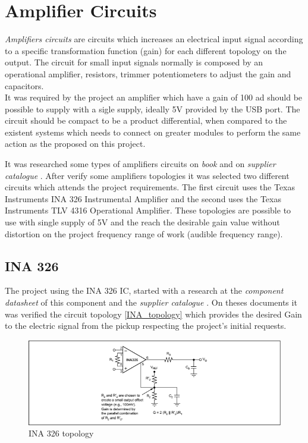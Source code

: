 \chapter{Amplifier Circuits}
\textit{Amplifiers circuits} \cite{amplifier-circuit} are circuits which increases an electrical input signal according
to a specific transformation function (gain) for each different topology on the output. The circuit for small input signals
normally is composed by an operational amplifier, resistors, trimmer potentiometers to adjust the gain and capacitors.\\

It was required by the project an amplifier which have a gain of 100 ad should be possible to supply with a sigle supply, ideally 5V provided by
the USB port. The circuit should be compact to be a product differential, when compared to the existent systems which needs to connect on greater modules
to perform the same action as the proposed on this project.

It was researched some types of amplifiers circuits on \textit{book} \cite{Milmann} and on \textit{supplier catalogue} \cite{OpAmps}.
After verify some amplifiers topologies it was selected two different circuits which attends the project requirements.
The first circuit uses the Texas Instruments INA 326
Instrumental Amplifier and the second uses the Texas Instruments TLV 4316 Operational Amplifier. These topologies are possible to use with
single supply of 5V and the reach the desirable gain value without distortion on the project frequency range of work (audible frequency range).

\section{INA 326}
The project using the INA 326 IC, started with a research at the \textit{component datasheet} \cite{INA326}
of this component and the \textit{supplier catalogue} \cite{OpAmps}. On theses documents it was verified
the circuit topology \autoref{INA_topology} which provides the desired Gain to
the electric signal from the pickup respecting the project's initial requests.

\begin{figure}[!htpb]
\centering
\caption{INA 326 topology}
\label{INA_topology}
\includegraphics[scale=1]{images/Texas_INA}
\end{figure}

